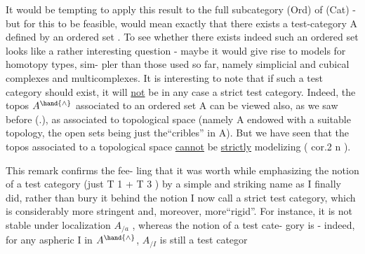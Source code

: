 It would be tempting to apply this result to the full subcategory
(Ord) of (Cat) - but for this to be feasible, would mean exactly that
there exists a test-category A defined by an ordered set . To see whether
there exists indeed such an ordered set looks like a rather interesting
question - maybe it would give rise to  models for homotopy types, sim-
pler than those used so far, namely simplicial and cubical complexes and
multicomplexes. It is interesting to note that if such a test category
should exist, it will \uline{not} be in any case a strict test category. Indeed,
the topos $A^{\hand{\wedge}}$ associated to an ordered set A can be viewed also, as we saw
before (\hand{\S}.), as associated to   topological space (namely A endowed
with a suitable topology, the open sets being just the``cribles'' in A).
But we have seen that the topos associated to a topological space \uline{cannot}
be \uline{strictly} modelizing ( cor.2 n  ).  This remark confirms the fee-
ling that it was worth while emphasizing the notion of a test category
 (just T 1 + T 3 ) by a simple and striking name as I finally did, rather
than bury it behind the notion I now call a strict test category, which
is considerably more stringent and, moreover, more``rigid''. For instance,
it is not stable under localization $A_{/a}$ , whereas the notion of a test cate-
gory is - indeed, for any aspheric I in $A^{\hand{\wedge}}$, $A_{/I}$ is still a test categor
